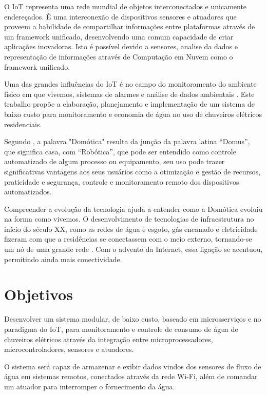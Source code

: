 O IoT representa uma rede mundial de objetos interconectados e unicamente endereçados. É uma interconexão de dispositivos sensores e atuadores que proveem a habilidade de compartilhar informações entre plataformas através de um framework unificado, desenvolvendo uma comum capacidade de criar aplicações inovadoras. Isto é possível devido a sensores, analise da dados e representação de informações através de Computação em Nuvem como o framework unificado. \cite{RisteskaStojkoska2017}

Uma das grandes influências do IoT é no campo do monitoramento do ambiente físico em que vivemos, sistemas de alarmes e análise de dados ambientais \cite{Perumal2016}. Este trabalho propõe a elaboração, planejamento e implementação de um sistema de baixo custo para monitoramento e economia de água no uso de chuveiros elétricos residenciais.

Segundo \cite{VarelaDeSouza}, a palavra "Domótica" resulta da junção da palavra latina
“Domus”, que significa casa, com “Robótica”, que pode ser entendido como controle automatizado de algum processo ou equipamento, seu uso pode trazer significativas vantagens aos seus usuários como a otimização e gestão de recursos, praticidade e segurança, controle e monitoramento remoto dos dispositivos automatizados.

Compreender a evolução da tecnologia ajuda a entender como a
Domótica evoluiu na forma como vivemos. O desenvolvimento de tecnologias de infraestrutura no início do século XX, como as redes de água e esgoto, gás encanado e eletricidade fizeram com que a residências se conectassem com o meio externo, tornando-se um nó de uma grande rede \cite{forty2007objetos}. Com o advento da Internet, essa ligação se acentuou, permitindo ainda mais conectividade. \cite{VarelaDeSouza} 



\section{Objetivos}

Desenvolver um sistema modular, de baixo custo, baseado em microsserviços e no paradigma do IoT, para monitoramento e controle de consumo de água de chuveiros elétricos através da integração entre microprocessadores, microcontroladores, sensores e atuadores. 

O sistema será capaz de armazenar e exibir dados vindos dos sensores de fluxo de água em sistemas remotos, conectados através da rede Wi-Fi, além de comandar um atuador para interromper o fornecimento da água.

